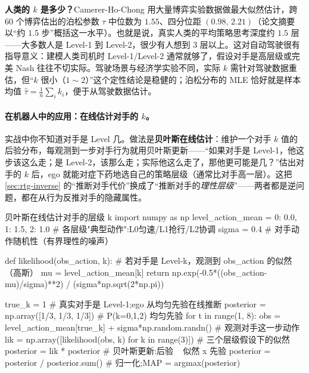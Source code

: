 \begin{note}
\textbf{人类的 $k$ 是多少？}\;Camerer-Ho-Chong 用大量博弈实验数据做最大似然估计，跨 $60$ 个博弈估出的泊松参数 $\tau$ 中位数为 $1.55$、四分位距 $(0.98,\,2.21)$（论文摘要以“约 $1.5$ 步”概括这一水平）\cite{camerer2004cognitive}。也就是说，真实人类的平均策略思考深度约 $1.5$ 层——大多数人是 Level-1 到 Level-2，很少有人想到 $3$ 层以上。这对自动驾驶很有指导意义：建模人类司机时 Level-1/Level-2 通常就够了，假设对手是高层级或完美 Nash 往往不切实际。驾驶场景与经济学实验不同，实际 $k$ 需针对驾驶数据重估，但“$k$ 很小（$1\sim2$）”这个定性结论是稳健的；泊松分布的 MLE 恰好就是样本均值 $\hat\tau=\tfrac1n\sum_i k_i$，便于从驾驶数据估计。
\end{note}

\paragraph{在机器人中的应用：在线估计对手的 $k$。}
实战中你不知道对手是 Level 几。做法是\textbf{贝叶斯在线估计}：维护一个对手 $k$ 值的后验分布，每观测到一步对手行为就用贝叶斯更新——“如果对手是 Level-1，他这步该这么走；是 Level-2，该那么走；实际他这么走了，那他更可能是几？”估出对手的 $k$ 后，ego 就能对症下药地选自己的策略层级（通常比对手高一层）。这把 \cref{sec:rtg-inverse} 的“推断对手代价”换成了“推断对手的\emph{理性层级}”——两者都是逆问题，都在从行为反推对手的隐藏属性。

\begin{codebox}[Python]{贝叶斯在线估计对手的层级 k}
import numpy as np
level_action_mean = {0: 0.0, 1: 1.5, 2: 1.0}   # 各层级"典型动作":L0匀速/L1抢行/L2协调
sigma = 0.4                                     # 对手动作随机性（有界理性的噪声）

def likelihood(obs_action, k):                  # 若对手是 Level-k，观测到 obs_action 的似然（高斯）
    mu = level_action_mean[k]
    return np.exp(-0.5*((obs_action-mu)/sigma)**2) / (sigma*np.sqrt(2*np.pi))

true_k = 1                                       # 真实对手是 Level-1;ego 从均匀先验在线推断
posterior = np.array([1/3, 1/3, 1/3])           # P(k=0,1,2) 均匀先验
for t in range(1, 8):
    obs = level_action_mean[true_k] + sigma*np.random.randn()    # 观测对手这一步动作
    lik = np.array([likelihood(obs, k) for k in range(3)])       # 三个层级假设下的似然
    posterior = lik * posterior                                  # 贝叶斯更新:后验 ~ 似然 x 先验
    posterior = posterior / posterior.sum()                      # 归一化;MAP = argmax(posterior)
\end{codebox}

